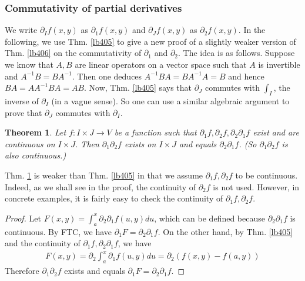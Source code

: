 \documentclass[12pt,b5paper,notitlepage]{article}
\theoremstyle{definition}
\theoremstyle{plain}
\newtheorem{thm}[df]{Theorem}
\newcommand{\dps}{\displaystyle}
\numberwithin{equation}{section}
\begin{document}
\subsubsection{Commutativity of partial derivatives}


We write $\partial_If(x,y)$ as $\partial_1f(x,y)$ and $\partial_Jf(x,y)$ as $\partial_2f(x,y)$. In the following, we use Thm. \ref{lb405} to give a new proof of a slightly weaker version of Thm. \ref{lb406} on the commutativity of $\partial_1$ and $\partial_2$. The idea is as follows. Suppose we know that $A,B$ are linear operators on a vector space such that $A$ is invertible and $A^{-1}B=BA^{-1}$. Then one deduces $A^{-1}BA=BA^{-1}A=B$ and hence $BA=AA^{-1}BA=AB$. Now, Thm. \ref{lb405} says that $\partial_J$  commutes with $\int_I$, the inverse of $\partial_I$ (in a vague sense). So one can use a similar algebraic argument to prove that $\partial_J$ commutes with $\partial_I$.



\begin{thm}\label{lb407}
Let $f:I\times J\rightarrow V$ be a function such that $\partial_1f,\partial_2f,\partial_2\partial_1f$ exist and are continuous on $I\times J$. Then $\partial_1\partial_2f$ exists on $I\times J$ and equals $\partial_2\partial_1f$. (So $\partial_1\partial_2f$ is also continuous.)
\end{thm}


Thm. \ref{lb407} is weaker than Thm. \ref{lb405} in that we assume $\partial_1f,\partial_2f$ to be continuous. Indeed, as we shall see in the proof, the continuity of $\partial_2f$ is not used. However, in concrete examples, it is fairly easy to check the continuity of  $\partial_1f,\partial_2f$. 


\begin{proof}
Let $\dps F(x,y)=\int_a^x\partial_2\partial_1 f(u,y)du$, which can be defined because $\partial_2\partial_1f$ is continuous. By FTC, we have $\partial_1F=\partial_2\partial_1f$. On the other hand, by Thm. \ref{lb405} and the continuity of $\partial_1f,\partial_2\partial_1f$, we have
\begin{align*}
F(x,y)=\partial_2\int_a^x\partial_1f(u,y)du=\partial_2(f(x,y)-f(a,y))
\end{align*}
Therefore $\partial_1\partial_2f$ exists and equals $\partial_1F=\partial_2\partial_1f$.
\end{proof}
\end{document}
